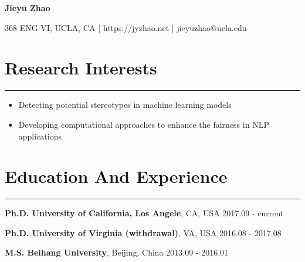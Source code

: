 \documentclass[11pt, a4paper]{article}
\newcommand{\hr}{\hrule\vspace{0.5em}}
\begin{document}
\thispagestyle{fancy}	

\begin{center}
	{\large \bf Jieyu Zhao}
\end{center}
\begin{center}
	{368 ENG VI, UCLA, CA | {https://jyzhao.net} | {jieyuzhao@ucla.edu}}
\end{center}

\section*{Research Interests}
\hr
\begin{itemize}
\item Detecting potential stereotypes in machine learning models
\item Developing computational approaches to enhance the fairness in NLP applications
\end{itemize}


\section*{Education And Experience}
\hr
\textbf{Ph.D. University of California, Los Angele}, CA, USA \hfill {2017.09 - current}

\textbf{Ph.D. University of Virginia (withdrawal)}, VA, USA \hfill 2016.08 - 2017.08

\textbf{M.S. Beihang University}, Beijing, China \hfill 2013.09 - 2016.01
\end{document}
